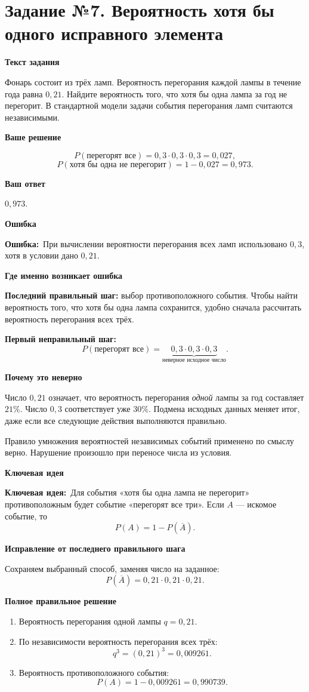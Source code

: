 \documentclass[a4paper,12pt]{article}
\newcommand{\tasktitle}[2]{\phantomsection\label{task:#1}\section*{Задание №#1. #2}}
\newcommand{\err}{\textcolor{errorred}{\textbf{Ошибка:}}\ }
\newcommand{\idea}{\textcolor{deepaccent}{\textbf{Ключевая идея:}}\ }
\newcommand{\lab}[1]{\par\noindent\textbf{#1}\par\vspace{-4pt}}
\begin{document}
\tasktitle{7}{Вероятность хотя бы одного исправного элемента}
\lab{Текст задания}
Фонарь состоит из трёх ламп. Вероятность перегорания каждой лампы в течение года равна $0{,}21$. Найдите вероятность того, что хотя бы одна лампа за год не перегорит. В стандартной модели задачи события перегорания ламп считаются независимыми.

\lab{Ваше решение}
\[
P(\text{перегорят все})=0{,}3\cdot0{,}3\cdot0{,}3=0{,}027,
\]
\[
P(\text{хотя бы одна не перегорит})=1-0{,}027=0{,}973.
\]
\lab{Ваш ответ}
$0{,}973$.

\lab{Ошибка}
\err При вычислении вероятности перегорания всех ламп использовано $0{,}3$, хотя в условии дано $0{,}21$.

\lab{Где именно возникает ошибка}
\textbf{Последний правильный шаг:} выбор противоположного события. Чтобы найти вероятность того, что хотя бы одна лампа сохранится, удобно сначала рассчитать вероятность перегорания всех трёх.

\textbf{Первый неправильный шаг:}
\[
P(\text{перегорят все})=\underbrace{0{,}3\cdot0{,}3\cdot0{,}3}_{\text{неверное исходное число}}.
\]

\lab{Почему это неверно}
Число $0{,}21$ означает, что вероятность перегорания \emph{одной} лампы за год составляет $21\%$. Число $0{,}3$ соответствует уже $30\%$. Подмена исходных данных меняет итог, даже если все следующие действия выполняются правильно.

Правило умножения вероятностей независимых событий применено по смыслу верно. Нарушение произошло при переносе числа из условия.

\lab{Ключевая идея}
\idea Для события «хотя бы одна лампа не перегорит» противоположным будет событие «перегорят все три». Если $A$ --- искомое событие, то
\[
P(A)=1-P(\overline{A}).
\]

\lab{Исправление от последнего правильного шага}
Сохраняем выбранный способ, заменяя число на заданное:
\[
P(\overline A)=0{,}21\cdot0{,}21\cdot0{,}21.
\]

\lab{Полное правильное решение}
\begin{enumerate}
\item Вероятность перегорания одной лампы $q=0{,}21$.
\item По независимости вероятность перегорания всех трёх:
\[
q^3=(0{,}21)^3=0{,}009261.
\]
\item Вероятность противоположного события:
\[
P(A)=1-0{,}009261=\boxed{0{,}990739}.
\]
\end{enumerate}
\end{document}
